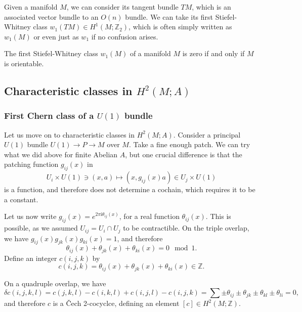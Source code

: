 \documentclass[12pt]{article}
\numberwithin{equation}{section}
\theoremstyle{remark}
\def\bZ{\mathbb{Z}}
\def\I{\mathrm{i}}
\begin{document}
Given a manifold $M$, we can consider its tangent bundle $TM$, which is an associated vector bundle to an $O(n)$ bundle.
We can take its first Stiefel-Whitney class $w_1(TM)\in H^1(M;\bZ_2)$,
which is often simply written as $w_1(M)$ or even just as $w_1$ 
if no confusion arises.

\begin{proposition}
  The first Stiefel-Whitney class $w_1(M)$ of a manifold $M$ is zero if and only if $M$ is orientable.
\end{proposition}

\subsection{Characteristic classes in $H^2(M;A)$}

\subsubsection{First Chern class of a $U(1)$ bundle}

Let us move on to characteristic classes in $H^2(M;A)$.
Consider a principal $U(1)$ bundle $U(1)\to P\to M$ over $M$.
Take a fine enough patch.
We can try what we did above for finite Abelian $A$,
but one crucial difference is that the patching function $g_{ij}(x)$ in \begin{equation}
  U_i\times U(1)\ni (x,a) \mapsto (x,g_{ij}(x)a)\in U_j\times U(1)
\end{equation} is a function,
and therefore does not determine a cochain,
which requires it to be a constant.

Let us now write $g_{ij}(x)=e^{2\pi\I\theta_{ij}(x)}$, for a real function $\theta_{ij}(x)$.
This is possible, as we assumed $U_{ij}=U_i\cap U_j$ to be contractible.
On the triple overlap, we have $g_{ij}(x)g_{jk}(x)g_{ki}(x)=1$, and therefore \begin{equation}
\theta_{ij}(x)+\theta_{jk}(x)+\theta_{ki}(x) = 0 \mod 1.
\end{equation} Define an integer $c(i,j,k)$ by \begin{equation}
c(i,j,k) = \theta_{ij}(x)+\theta_{jk}(x)+\theta_{ki}(x) \in \bZ.
\end{equation}

On a quadruple overlap, we have \begin{equation}
  \delta c(i,j,k,l) = c(j,k,l) - c(i,k,l) + c(i,j,l) - c(i,j,k) 
  = \sum \pm \theta_{ij} \pm \theta_{jk} \pm \theta_{kl} \pm \theta_{li} = 0 ,
\end{equation}
and therefore $c$ is a \v Cech 2-cocyclce, defining an element $[c]\in H^2(M;\bZ)$.
\end{document}
